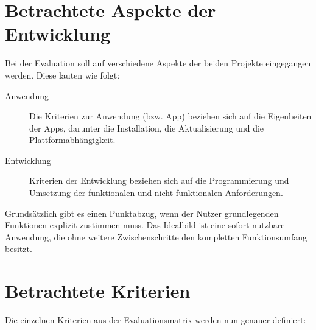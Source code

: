 \section{Betrachtete Aspekte der Entwicklung}
Bei der Evaluation soll auf verschiedene Aspekte der beiden Projekte eingegangen werden. Diese lauten wie folgt:
\begin{description}
	\item [Anwendung]
		Die Kriterien zur Anwendung (bzw. App) beziehen sich auf die Eigenheiten der Apps, darunter die Installation, die Aktualisierung und die Plattformabhängigkeit.
		
	\item [Entwicklung]
		Kriterien der Entwicklung beziehen sich auf die Programmierung und Umsetzung der funktionalen und nicht-funktionalen Anforderungen.
			
\end{description}


Grundsätzlich gibt es einen Punktabzug, wenn der Nutzer grundlegenden Funktionen explizit zustimmen muss. Das Idealbild ist eine sofort nutzbare Anwendung, die ohne weitere Zwischenschritte den kompletten Funktionsumfang besitzt.

\section{Betrachtete Kriterien}
Die einzelnen Kriterien aus der Evaluationsmatrix werden nun genauer definiert:

